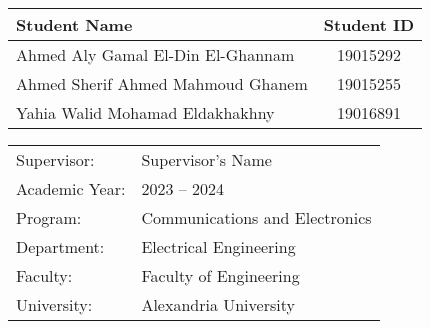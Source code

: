 \begin{titlepage}

\begin{center}





{\makeatletter
\largetitlestyle\fontsize{42}{42}\selectfont\@title
\makeatother}

\vspace{5mm}

{\makeatletter
\ifdefvoid{\@subtitle}{}{\bigskip\titlestyle\fontsize{20}{20}\selectfont\@subtitle}
\makeatother}





\vspace{12mm}

\setlength\extrarowheight{7pt}
\begin{tabular}{lc}
    {\large Student Name} & {\large Student ID} \\\midrule
    {\large Ahmed Aly Gamal El-Din El-Ghannam} & {\large 19015292} \\
    {\large Ahmed Sherif Ahmed Mahmoud Ghanem} & {\large 19015255} \\
    {\large Yahia Walid Mohamad Eldakhakhny} & {\large 19016891} \\
\end{tabular}

\vfill

\begin{tabular}{ll}
    {Supervisor:} & {Supervisor's Name} \\
    {Academic Year}: & {2023 -- 2024} \\
    {Program:} & {Communications and Electronics} \\
    {Department:} & {Electrical Engineering} \\
    {Faculty:} & {Faculty of Engineering} \\
    {University:} & {Alexandria University}
\end{tabular}



\end{center}
\end{titlepage}
